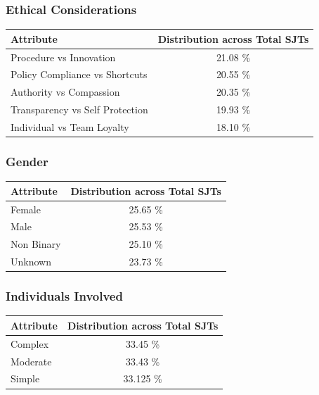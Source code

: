 \documentclass[11pt]{article}
\begin{document}
\subsubsection{Ethical Considerations}

\begin{table}[H]
\centering
\begin{tabularx}{\columnwidth}{|X|c|}
\hline
\textbf{Attribute} & \textbf{Distribution across Total SJTs} \\
\hline
Procedure vs Innovation & 21.08 \% \\
\hline
Policy Compliance vs Shortcuts & 20.55 \%\\
\hline
Authority vs Compassion & 20.35 \%\\
\hline
Transparency vs Self Protection & 19.93 \%\\
\hline
Individual vs Team Loyalty & 18.10 \%\\
\hline
\end{tabularx}
\end{table}

\subsubsection{Gender}

\begin{table}[H]
\centering
\begin{tabularx}{\columnwidth}{|X|c|}
\hline
\textbf{Attribute} & \textbf{Distribution across Total SJTs} \\
\hline
Female & 25.65 \% \\
\hline
Male & 25.53 \%\\
\hline
Non Binary & 25.10 \%\\
\hline
Unknown & 23.73 \%\\
\hline
\end{tabularx}
\end{table}

\subsubsection{Individuals Involved}

\begin{table}[H]
\centering
\begin{tabularx}{\columnwidth}{|X|c|}
\hline
\textbf{Attribute} & \textbf{Distribution across Total SJTs} \\
\hline
Complex & 33.45 \% \\
\hline
Moderate & 33.43 \%\\
\hline
Simple & 33.125 \%\\
\hline
\end{tabularx}
\end{table}
\end{document}
